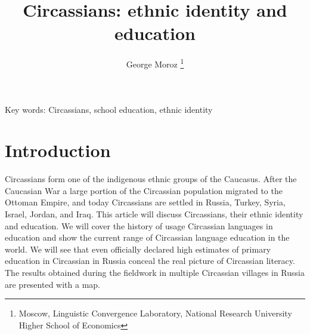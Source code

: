 

\title{Circassians: ethnic identity and education}
\author{George Moroz \thanks{Moscow, Linguistic Convergence Laboratory, National Research University Higher School of Economics}}
\date{\vspace{-5ex}}
\maketitle

Key words: Circassians, school education, ethnic identity \bigskip

\section{Introduction}
Circassians form one of the indigenous ethnic groups of the Caucasus. After the Caucasian War a large portion of the Circassian population migrated to the Ottoman Empire, and today Circassians are settled in Russia, Turkey, Syria, Israel, Jordan, and Iraq. This article will discuss Circassians, their ethnic identity and education. We will cover the history of usage Circassian languages in education and show the current range of Circassian language education in the world. We will see that even officially declared high estimates of primary education in Circassian in Russia conceal the real picture of Circassian literacy. The results obtained during the fieldwork in multiple Circassian villages in Russia are presented with a map.

